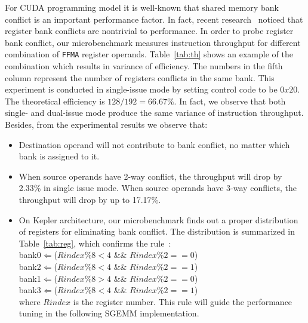 For CUDA programming model it is well-known that shared memory bank conflict is an important performance factor. In
fact, recent research~\cite{lai} noticed that register bank conflicts are nontrivial to performance.  In order to probe 
register bank conflict, our microbenchmark measures instruction throughput for different combination of {\tt FFMA} 
register operands. Table~\ref{tab:th} shows an example of the combination which results in variance of efficiency. The 
numbers in the fifth column represent the number of registers conflicts in the same bank. This experiment is conducted 
in single-issue mode by setting control code to be $0x20$. The theoretical efficiency is $128/192=66.67\%$. In fact, we 
observe that both single- and dual-issue mode produce the same variance of instruction throughput. Besides, from the 
experimental results we observe that:
\begin{itemize}
\item Destination operand will not contribute to bank conflict, no matter which bank is assigned to it.
\item When source operands have 2-way conflict, the throughput will drop by 2.33\% in single issue
    mode. When source operands have 3-way conflicts, the throughput will drop by up to 17.17\%.

 \item On Kepler architecture, our microbenchmark finds out a proper distribution of registers for eliminating bank
     conflict. The distribution is summarized in Table~\ref{tab:reg}, which confirms the rule~\cite{lai}: \\
 bank0$\Leftarrow$($Rindex \% 8 < 4$ \&\& $Rindex \% 2 == 0$) \\
 bank2$\Leftarrow$($Rindex \% 8 < 4$ \&\&
$Rindex \% 2 == 1$) \\
bank1$\Leftarrow$($Rindex \% 8 > 4$ \&\& $Rindex \%2 == 0$) \\
bank3$\Leftarrow$($Rindex \% 8 < 4$ \&\&
$Rindex\% 2 == 1$)\\
where $Rindex$ is the register number. This rule will guide the performance tuning in the following SGEMM 
implementation.

\end{itemize}

